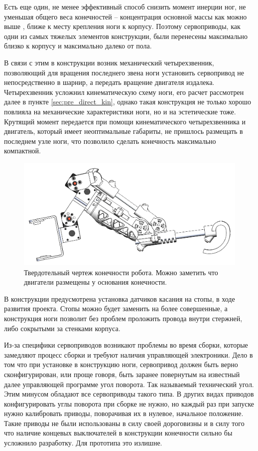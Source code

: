 Есть еще один, не менее эффективный способ снизить момент инерции ног, не уменьшая общего веса конечностей -- концентрация основной массы как можно выше \cite{Seok2012}, ближе к месту крепления ноги к корпусу. Поэтому сервоприводы, как одни из самых тяжелых элементов конструкции, были перенесены максимально близко к корпусу и максимально далеко от пола.

В связи с этим в конструкции возник механический четырехзвенник, позволяющий для вращения последнего звена ноги установить сервопривод не непосредственно в шарнир, а передать вращение двигателя издалека. Четырехзвенник усложнил кинематическую схему ноги, его расчет рассмотрен далее в пункте \ref{sec:pre_direct_kin}, однако такая конструкция не только хорошо повлияла на механические характеристики ноги, но и на эстетические тоже. Крутящий момент передается при помощи кинематического четырехзвенника и двигатель, который имеет неоптимальные габариты, не пришлось размещать в последнем узле ноги, что позволило сделать конечность максимально компактной.

\begin{figure}[h]
    \centering
    \includegraphics[scale=0.7]{chapter_mechanics_construction/figure7.png}
    \caption{Твердотельный чертеж конечности робота. Можно заметить что двигатели размещены у основания конечности.}
    \label{}
\end{figure}

В конструкции предусмотрена установка датчиков касания на стопы, в ходе развития проекта. Стопы можно будет заменить на более совершенные, а конструкция ноги позволит без проблем проложить провода внутри стержней, либо сокрытыми за стенками корпуса.

Из-за специфики сервоприводов возникают проблемы во время сборки, которые замедляют процесс сборки и требуют наличия управляющей электроники. Дело в том что при установке в конструкцию ноги, сервопривод должен быть верно сконфигурирован, или проще говоря, быть заранее повернутым на известный далее управляющей программе угол поворота. Так называемый технический угол. Этим минусом обладают все сервоприводы такого типа. В других видах приводов конфигурировать углы поворота при сборке не нужно, но каждый раз при запуске нужно калибровать приводы, поворачивая их в нулевое, начальное положение. Такие приводы не были использованы в силу своей дороговизны и в силу того что наличие концевых выключателей в конструкции конечности сильно бы усложнило разработку. Для прототипа это излишне.

